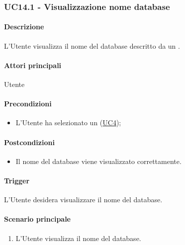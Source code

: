 
\subsubsection{UC14.1 - Visualizzazione nome database}\label{UC14point1}
\paragraph*{Descrizione}
L'Utente visualizza il nome del database descritto da un .

\paragraph*{Attori principali}
Utente

\paragraph*{Precondizioni}
\begin{itemize}
  \item L'Utente ha selezionato un  (\hyperref[UC4]{UC4});
\end{itemize}

\paragraph*{Postcondizioni}
\begin{itemize}
  \item Il nome del database viene visualizzato correttamente.
\end{itemize}

\paragraph*{Trigger}
L'Utente desidera visualizzare il nome del database.

\paragraph*{Scenario principale}
\begin{enumerate}
  \item L'Utente visualizza il nome del database.
\end{enumerate}


